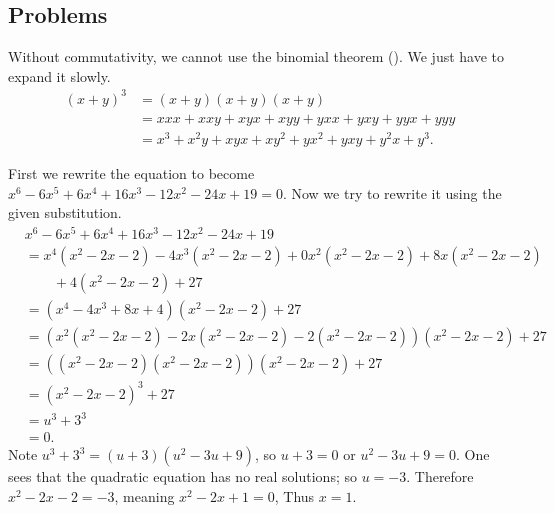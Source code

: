 \subsection*{Problems}
\begin{questions}
    \item Without commutativity, we cannot use the binomial theorem (). We just have to expand it slowly.
    \begin{align*}
        (x+y)^3 &= (x+y)(x+y)(x+y)\\
        &= xxx + xxy + xyx + xyy + yxx + yxy + yyx + yyy\\
        &= x^3 + x^2y + xyx + xy^2 + yx^2 + yxy + y^2x + y^3.
    \end{align*}

    \item First we rewrite the equation to become $x^6 - 6x^5 + 6x^4 + 16x^3 - 12x^2 - 24x + 19 = 0$. Now we try to rewrite it using the given substitution.
    \begin{align*}
        &x^6 - 6x^5 + 6x^4 + 16x^3 - 12x^2 - 24x + 19\\
        &=x^4(x^2-2x-2) - 4x^3(x^2-2x-2) + 0x^2(x^2-2x-2) + 8x(x^2-2x-2)\\
        &\quad\quad+ 4(x^2-2x-2) + 27\\
        &= (x^4-4x^3+8x+4)(x^2-2x-2) + 27\\
        &= (x^2(x^2-2x-2) - 2x(x^2-2x-2) - 2(x^2-2x-2))(x^2-2x-2) + 27\\
        &= ((x^2-2x-2)(x^2-2x-2))(x^2-2x-2)+27\\
        &= (x^2-2x-2)^3 + 27\\
        &= u^3 + 3^3\\
        &= 0.
    \end{align*}
    Note $u^3 + 3^3 = (u+3)(u^2 - 3u + 9)$, so $u+3 = 0$ or $u^2 - 3u + 9 = 0$. One sees that the quadratic equation has no real solutions; so $u = -3$. Therefore $x^2 - 2x - 2 = -3$, meaning $x^2-2x+1 = 0$, Thus $x = 1$.


\end{questions}
